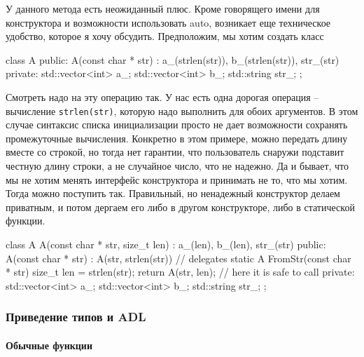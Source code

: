 У данного метода есть неожиданный плюс.
Кроме говорящего имени для конструктора и возможности использовать auto, возникает еще техническое удобство, которое я хочу обсудить.
Предположим, мы хотим создать класс
\begin{cppcode}
class A {
public:
  A(const char * str) : a_(strlen(str)), b_(strlen(str)), str_(str) {}
private:
  std::vector<int> a_;
  std::vector<int> b_;
  std::string str_;
};
\end{cppcode}
Смотреть надо на эту операцию так.
У нас есть одна дорогая операция -- вычисление \verb"strlen(str)", которую надо выполнить для обоих аргументов.
В этом случае синтаксис списка инициализации просто не дает возможности сохранять промежуточные вычисления.
Конкретно в этом примере, можно передать длину вместе со строкой, но тогда нет гарантии, что пользователь снаружи подставит честную длину строки, а не случайное число, что не надежно.
Да и бывает, что мы не хотим менять интерфейс конструктора и принимать не то, что мы хотим.
Тогда можно поступить так.
Правильный, но ненадежный конструктор делаем приватным, и потом дергаем его либо в другом конструкторе, либо в статической функции.
\begin{cppcode}
class A {
  A(const char * str, size_t len) : a_(len), b_(len), str_(str) {}
public:
  A(const char * str) : A(str, strlen(str)) {} // delegates
  static A FromStr(const char * str) {
    size_t len = strlen(str);
    return A(str, len); // here it is safe to call
  }
private:
  std::vector<int> a_;
  std::vector<int> b_;
  std::string str_;
};
\end{cppcode}


\subsubsection{Приведение типов и ADL}

\paragraph{Обычные функции}

